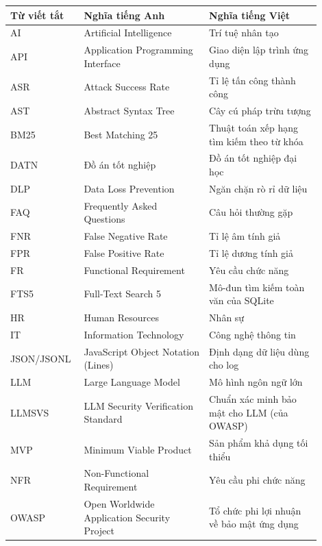 \begin{longtable}{p{0.18\linewidth} >{\raggedright\arraybackslash}p{0.38\linewidth} >{\raggedright\arraybackslash}p{0.34\linewidth}}
\toprule
\bfseries Từ viết tắt & \bfseries Nghĩa tiếng Anh & \bfseries Nghĩa tiếng Việt \\
\midrule
\endhead
\bottomrule
\endfoot
AI & Artificial Intelligence & Trí tuệ nhân tạo \\
\addlinespace
API & Application Programming Interface & Giao diện lập trình ứng dụng \\
\addlinespace
ASR & Attack Success Rate & Tỉ lệ tấn công thành công \\
\addlinespace
AST & Abstract Syntax Tree & Cây cú pháp trừu tượng \\
\addlinespace
BM25 & Best Matching 25 & Thuật toán xếp hạng tìm kiếm theo từ khóa \\
\addlinespace
DATN & Đồ án tốt nghiệp & Đồ án tốt nghiệp đại học \\
\addlinespace
DLP & Data Loss Prevention & Ngăn chặn rò rỉ dữ liệu \\
\addlinespace
FAQ & Frequently Asked Questions & Câu hỏi thường gặp \\
\addlinespace
FNR & False Negative Rate & Tỉ lệ âm tính giả \\
\addlinespace
FPR & False Positive Rate & Tỉ lệ dương tính giả \\
\addlinespace
FR & Functional Requirement & Yêu cầu chức năng \\
\addlinespace
FTS5 & Full-Text Search 5 & Mô-đun tìm kiếm toàn văn của SQLite \\
\addlinespace
HR & Human Resources & Nhân sự \\
\addlinespace
IT & Information Technology & Công nghệ thông tin \\
\addlinespace
JSON/JSONL & JavaScript Object Notation (Lines) & Định dạng dữ liệu dùng cho log \\
\addlinespace
LLM & Large Language Model & Mô hình ngôn ngữ lớn \\
\addlinespace
LLMSVS & LLM Security Verification Standard & Chuẩn xác minh bảo mật cho LLM (của OWASP) \\
\addlinespace
MVP & Minimum Viable Product & Sản phẩm khả dụng tối thiểu \\
\addlinespace
NFR & Non-Functional Requirement & Yêu cầu phi chức năng \\
\addlinespace
OWASP & Open Worldwide Application Security Project & Tổ chức phi lợi nhuận về bảo mật ứng dụng \\

\end{longtable}

